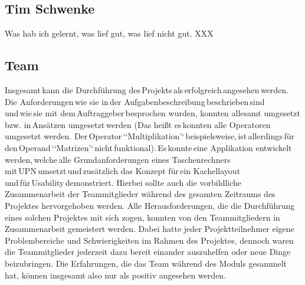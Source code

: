 \subsection{Tim Schwenke}
Was hab ich gelernt, was lief gut, was lief nicht gut.
XXX

\subsection{Team}
Insgesamt kann die Durchführung des Projekts als erfolgreich angesehen werden. Die Anforderungen wie sie in der Aufgabenbeschreibung beschrieben sind und wie sie mit dem Auftraggeber besprochen wurden, konnten allesamt umgesetzt bzw. in Ansätzen umgesetzt werden (Das heißt es konnten alle Operatoren umgesetzt werden. Der Operator ‘‘Multiplikation’‘ beispielsweise, ist allerdings für den Operand ‘‘Matrizen’‘ nicht funktional). Es konnte eine Applikation entwickelt werden, welche alle Grundanforderungen eines Taschenrechners mit UPN umsetzt und zusätzlich das Konzept für ein Kachellayout und für Usability demonstriert. Hierbei sollte auch die vorbildliche Zusammenarbeit der Teammitglieder während des gesamten Zeitraums des Projektes hervorgehoben werden. Alle Herausforderungen, die die Durchführung eines solchen Projektes mit sich zogen, konnten von den Teammitgliedern in Zusammenarbeit gemeistert werden. Dabei hatte jeder Projektteilnehmer eigene Problembereiche und Schwierigkeiten im Rahmen des Projektes, dennoch waren die Teammitglieder jederzeit dazu bereit einander auszuhelfen oder neue Dinge beizubringen. Die Erfahrungen, die das Team während des Moduls gesammelt hat, können insgesamt also nur als positiv angesehen werden. 
